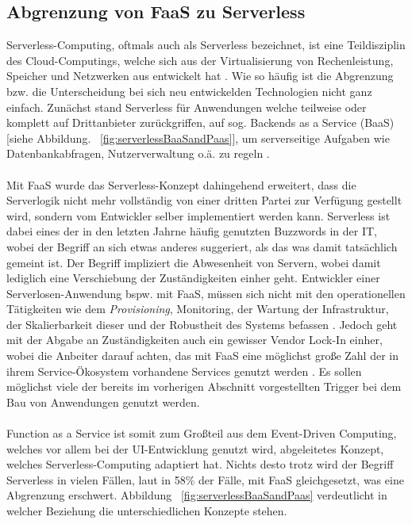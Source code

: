 \documentclass[11pt]{article}
\begin{document}
\subsection{Abgrenzung von FaaS zu Serverless}
Serverless-Computing, oftmals auch als Serverless bezeichnet, ist eine Teildisziplin des Cloud-Computings, welche sich aus der Virtualisierung von Rechenleistung, Speicher und Netzwerken aus entwickelt hat \cite{jackson2018investigation}. Wie so häufig ist die Abgrenzung bzw. die Unterscheidung bei sich neu entwickelden Technologien nicht ganz einfach. Zunächst stand Serverless für Anwendungen welche teilweise oder komplett auf Drittanbieter zurückgriffen, auf sog. Backends as a Service (BaaS) [siehe Abbildung. ~\ref{fig:serverlessBaaSandPaas}], um serverseitige Aufgaben wie Datenbankabfragen, Nutzerverwaltung o.ä. zu regeln \cite{fowler2018serverless}. \\\\
Mit FaaS wurde das Serverless-Konzept dahingehend erweitert, dass die Serverlogik nicht mehr vollständig von einer dritten Partei zur Verfügung gestellt wird, sondern vom Entwickler selber implementiert werden kann. Serverless ist dabei eines der in den letzten Jahrne häufig genutzten Buzzwords in der IT, wobei der Begriff an sich etwas anderes suggeriert, als das was damit tatsächlich gemeint ist. Der Begriff impliziert die Abwesenheit von Servern, wobei damit lediglich eine Verschiebung der Zuständigkeiten einher geht. Entwickler einer \glqq Serverlosen\grqq{}-Anwendung bspw. mit FaaS, müssen sich nicht mit den operationellen Tätigkeiten wie dem \textit{Provisioning}, Monitoring, der Wartung der Infrastruktur, der Skalierbarkeit dieser und der Robustheit des Systems befassen \cite{baldini2017serverless}. Jedoch geht mit der Abgabe an Zuständigkeiten auch ein gewisser Vendor Lock-In einher, wobei die Anbeiter darauf achten, das mit FaaS eine möglichst große Zahl der in ihrem Service-Ökosystem vorhandene Services genutzt werden \cite{kritikos2018review}. Es sollen möglichst viele der bereits im vorherigen Abschnitt vorgestellten Trigger bei dem Bau von Anwendungen genutzt werden. \\\\
Function as a Service ist somit zum Großteil aus dem Event-Driven Computing, welches vor allem bei der UI-Entwicklung genutzt wird, abgeleitetes Konzept, welches Serverless-Computing adaptiert hat. Nichts desto trotz wird der Begriff Serverless in vielen Fällen, laut \cite{leitner2019mixed} in 58\% der Fälle, mit FaaS gleichgesetzt, was eine Abgrenzung erschwert. Abbildung ~\ref{fig:serverlessBaaSandPaas} verdeutlicht in welcher Beziehung die unterschiedlichen Konzepte stehen. 
\end{document}
